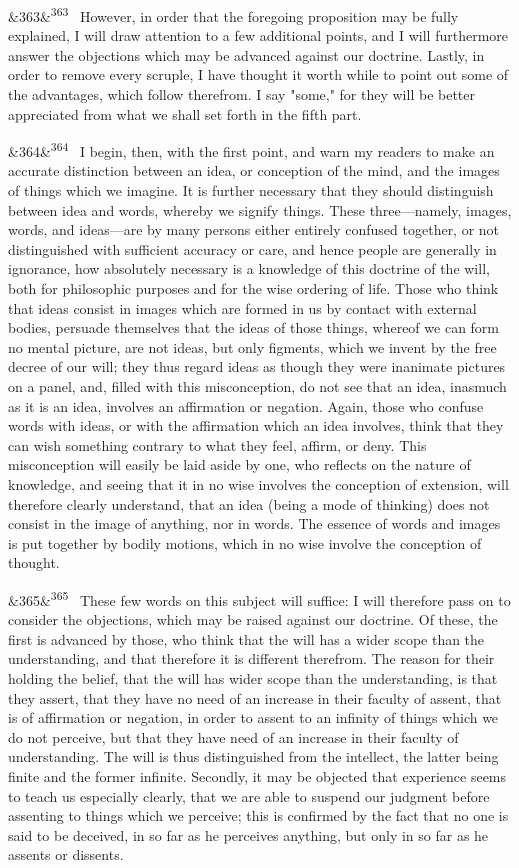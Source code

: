 \documentclass[12pt]{article}
\newcommand{\para}[1][]{\par\noindent\ifx&#1&\else\textsuperscript{\footnotesize #1}~\fi}
\begin{document}
\para[363] However, in order that the foregoing proposition may be fully explained, I will draw attention to a few additional points, and I will furthermore answer the objections which may be advanced against our doctrine. Lastly, in order to remove every scruple, I have thought it worth while to point out some of the advantages, which follow therefrom. I say "some," for they will be better appreciated from what we shall set forth in the fifth part.

\para[364] I begin, then, with the first point, and warn my readers to make an accurate distinction between an idea, or conception of the mind, and the images of things which we imagine. It is further necessary that they should distinguish between idea and words, whereby we signify things. These three---namely, images, words, and ideas---are by many persons either entirely confused together, or not distinguished with sufficient accuracy or care, and hence people are generally in ignorance, how absolutely necessary is a knowledge of this doctrine of the will, both for philosophic purposes and for the wise ordering of life. Those who think that ideas consist in images which are formed in us by contact with external bodies, persuade themselves that the ideas of those things, whereof we can form no mental picture, are not ideas, but only figments, which we invent by the free decree of our will; they thus regard ideas as though they were inanimate pictures on a panel, and, filled with this misconception, do not see that an idea, inasmuch as it is an idea, involves an affirmation or negation. Again, those who confuse words with ideas, or with the affirmation which an idea involves, think that they can wish something contrary to what they feel, affirm, or deny. This misconception will easily be laid aside by one, who reflects on the nature of knowledge, and seeing that it in no wise involves the conception of extension, will therefore clearly understand, that an idea (being a mode of thinking) does not consist in the image of anything, nor in words. The essence of words and images is put together by bodily motions, which in no wise involve the conception of thought.

\para[365] These few words on this subject will suffice: I will therefore pass on to consider the objections, which may be raised against our doctrine. Of these, the first is advanced by those, who think that the will has a wider scope than the understanding, and that therefore it is different therefrom. The reason for their holding the belief, that the will has wider scope than the understanding, is that they assert, that they have no need of an increase in their faculty of assent, that is of affirmation or negation, in order to assent to an infinity of things which we do not perceive, but that they have need of an increase in their faculty of understanding. The will is thus distinguished from the intellect, the latter being finite and the former infinite. Secondly, it may be objected that experience seems to teach us especially clearly, that we are able to suspend our judgment before assenting to things which we perceive; this is confirmed by the fact that no one is said to be deceived, in so far as he perceives anything, but only in so far as he assents or dissents.
\end{document}
